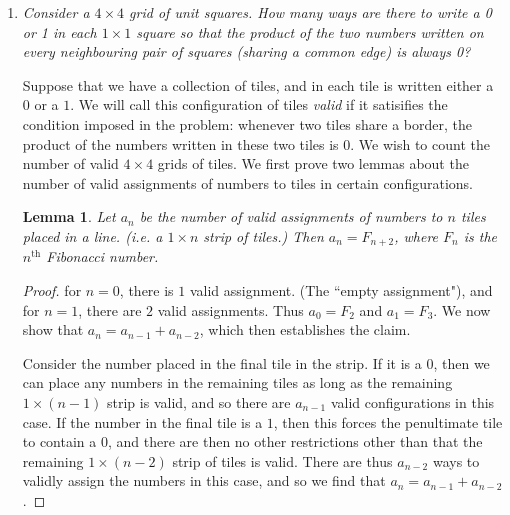 \documentclass[a4paper,12pt]{article}
\newtheorem{lemma}{Lemma}
\begin{document}
\begin{enumerate}
	\item
	\textit{Consider a $4 \times 4$ grid of unit squares. How many ways are there to write a 0 or 1 in each $1 \times 1$ square so that the product of the two numbers written on every neighbouring pair of squares (sharing a common edge) is always 0?}
	
    Suppose that we have a collection of tiles, and in each tile is written
    either a $0$ or a $1$. We will call this configuration of tiles
    \emph{valid} if it satisifies the condition imposed in the problem:
    whenever two tiles share a border, the product of the numbers written
    in these two tiles is $0$. We wish to count the number of valid $4 \times
    4$ grids of tiles. We first prove two lemmas about the number of valid
    assignments of numbers to tiles in certain configurations.

    \begin{lemma} \label{lemma:strip}
        Let $a_n$ be the number of valid assignments of numbers to $n$ tiles
        placed in a line. (i.e. a $1 \times n$ strip of tiles.) Then $a_n =
        F_{n+2}$, where $F_n$ is the $n^\text{th}$ Fibonacci number.
    \end{lemma}
    \begin{proof}
        for $n=0$, there is $1$ valid assignment. (The ``empty
        assignment"), and for $n=1$, there are $2$ valid assignments. Thus
        $a_0=F_2$ and $a_1=F_3$. We now show that $a_{n} = a_{n-1} + a_{n-2}$,
        which then establishes the claim.

        Consider the number placed in the final tile in the strip. If it is a
        $0$, then we can place any numbers in the remaining tiles as long as
        the remaining $1 \times (n-1)$ strip is valid, and so there are
        $a_{n-1}$ valid configurations in this case. If the number in the final
        tile is a $1$,
        then this forces the penultimate tile to contain a $0$, and there
        are then no other restrictions other than that the remaining $1 \times
        (n-2)$ strip of tiles is valid. There are thus $a_{n-2}$ ways to validly
        assign the numbers in this case, and so we find that $a_n = a_{n-1} +
        a_{n-2}$.
    \end{proof}


\end{enumerate}
\end{document}
